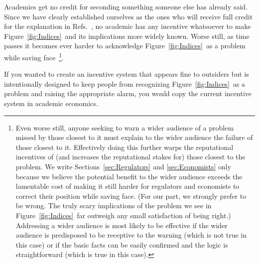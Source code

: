 \documentclass[twocolumn,twoside,prd,floatfix,letterpaper]{revtex4}
\def \FigMain {Figure~\ref{fig:Indices}}
\def \theExplanation {\cite{knuteson2016,knuteson2018,knuteson2019}}
\def \RefsTheExplanation {Refs.~\theExplanation}
\begin{document}
Academics get no credit for seconding something someone else has already said.  Since we have clearly established ourselves as the ones who will receive full credit for the explanation in \RefsTheExplanation, no academic has any incentive whatsoever to make \FigMain\ and its implications more widely known.  Worse still, as time passes it becomes ever harder to acknowledge \FigMain\ as a problem while saving face~\footnote{Even worse still, anyone seeking to warn a wider audience of a problem missed by those closest to it must explain to the wider audience the failure of those closest to it.  Effectively doing this further warps the reputational incentives of (and increases the reputational stakes for) those closest to the problem.  We write Sections~\ref{sec:Regulators} and \ref{sec:Economists} only because we believe the potential benefit to the wider audience exceeds the lamentable cost of making it still harder for regulators and economists to correct their position while saving face.  (For our part, we strongly prefer to be wrong.  The truly scary implications of the problem we see in \FigMain\ far outweigh any small satisfaction of being right.)  Addressing a wider audience is most likely to be effective if the wider audience is predisposed to be receptive to the warning (which is not true in this case) or if the basic facts can be easily confirmed and the logic is straightforward (which is true in this case).}.

If you wanted to create an incentive system that appears fine to outsiders but is intentionally designed to keep people from recognizing \FigMain\ as a problem and raising the appropriate alarm, you would copy the current incentive system in academic economics.
\end{document}
